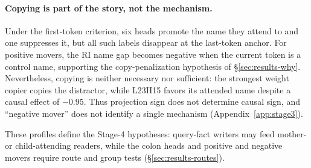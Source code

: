 \paragraph{Copying is part of the story, not the mechanism.}
Under the first-token criterion, six heads promote the name they attend to and one
suppresses it, but all such labels disappear at the last-token anchor. For positive
movers, the RI name gap becomes negative when the current token is a control name,
supporting the copy-penalization hypothesis of
\S\ref{sec:results-why}. Nevertheless, copying is neither necessary nor
sufficient: the strongest weight copier copies the distractor, while L23H15 favors
its attended name despite a causal effect of $-0.95$. Thus projection sign does
not determine causal sign, and ``negative mover'' does not identify a single
mechanism (Appendix~\ref{app:stage3}).

These profiles define the Stage-4 hypotheses: query-fact writers may feed
mother- or child-attending readers, while the colon heads and positive and
negative movers require route and group tests
(\S\ref{sec:results-routes}).
